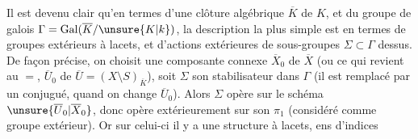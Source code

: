 Il est devenu clair qu'en termes d'une
clôture algébrique \(\overline K\) de \(K\), et du
groupe de galois  \(\Gamma=\operatorname{Gal}(\overline K/\unsure{K|k})\), la
description la plus simple est en
termes de groupes extérieurs à lacets, et
d'actions extérieures de sous-groupes  \(\Sigma\subset\Gamma\)
dessus. De façon précise,  on
choisit une composante connexe
\(\overline X_0\) de \(\overline X\) (ou ce qui revient au \(=\),
\(\overline U_0\) de \(\overline U=(X\setminus S)_{\overline K}\)), soit \(\Sigma\) son
stabilisateur dans \(\Gamma\) (il est remplacé
par un conjugué, quand on change
\(\overline U_0\)). Alors \(\Sigma\) opère sur le schéma
\(\unsure{\overline U_0|\overline X_0}\), donc opère extérieurement sur son
\(\pi_1\) (considéré comme groupe extérieur).
Or sur celui-ci il y a une structure
à lacets,  ens d'indices
